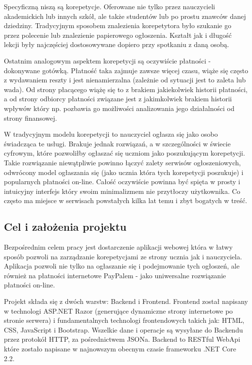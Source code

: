 \documentclass[12pt]{article}
\numberwithin{figure}{section}
\begin{document}
\begin{sloppypar}
Specyficzną niszą są korepetycje. Oferowane nie tylko przez nauczycieli akademickich lub innych szkół, ale także studentów lub po prostu znawców danej dziedziny. Tradycyjnym sposobem znalezienia korepetytora było szukanie go przez polecenie lub znalezienie papierowego ogłoszenia. Kształt jak i długość lekcji były najczęściej dostosowywane dopiero przy spotkaniu z daną osobą.

Ostatnim analogowym aspektem korepetycji są oczywiście płatności - dokonywane gotówką. Płatność taka zajmuje zawsze więcej czasu, wiąże się często z wydawaniem reszty i jest nienamierzalna (zależnie od sytuacji jest to zaleta lub wada). Od strony płacącego wiążę się to z brakiem jakiekolwiek historii płatności, a od strony odbiorcy płatności związane jest z jakimkolwiek brakiem historii wpływów który np. pozbawia go możliwości analizowania jego działalności od strony finansowej. 

W tradycyjnym modelu korepetycji to nauczyciel ogłasza się jako osobo świadcząca te usługi. Brakuje jednak rozwiązań, a w szczególności w świecie cyfrowym, które pozwoliłby ogłaszać się uczniom jako poszukującym korepetycji. Takie rozwiązanie niewątpliwie powinno łączyć zalety serwisów ogłoszeniowych, odwrócony model ogłaszania się (jako ucznia która tych korepetycji poszukuje) i popularnych płatności on-line. Całość oczywiście powinna być spięta w prosty i intuicyjny interfejs który swoim minimalizmem nie przytłoczy użytkownika. Co często ma miejsce w serwisach powstałych kilka lat temu i zbyt bogatych w treść.
\subsection{Cel i założenia projektu}
Bezpośrednim celem pracy jest dostarczenie aplikacji webowej która w łatwy sposób pozwoli na zarządzanie korepetycjami ze strony ucznia jak i nauczyciela. Aplikacja pozwoli nie tylko na ogłaszanie się i podejmowanie tych ogłoszeń, ale również na płatności internetowe PayPalem - jako uniwersalne rozwiązanie płatności on-line. 

Projekt składa się z dwóch warstw: Backend i Frontend.
Frontend został napisany w technologi ASP.NET Razor (generujące dynamiczne strony internetowe po stronie serwera) i fundamentalnych technologi frontendowych takich jak: HTML, CSS, JavaScript i Bootstrap. Wszelkie dane i operacje są wysyłane do Backendu przez protokół HTTP, za pośrednictwem JSONa. 
Backend to RESTful WebApi które zostało napisane w najnowszym obecnym czasie frameworku .NET Core 2.2.


\end{sloppypar}
\end{document}

